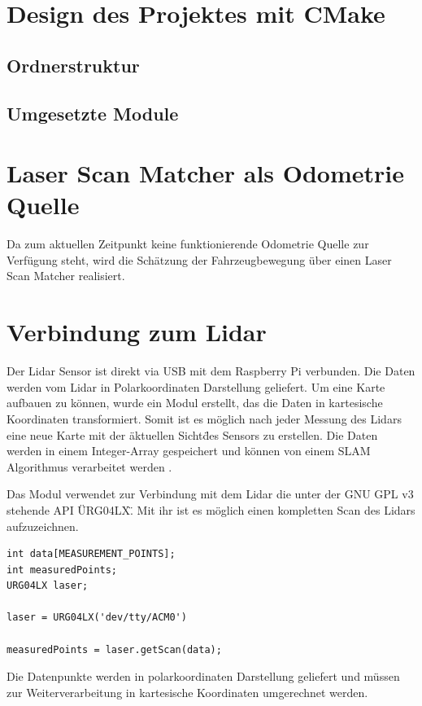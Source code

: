 \section{Design des Projektes mit CMake}


\subsection{Ordnerstruktur}

\subsection{Umgesetzte Module}

\section{Laser Scan Matcher als Odometrie Quelle}

Da zum aktuellen Zeitpunkt keine funktionierende Odometrie Quelle zur Verfügung steht, wird die Schätzung der Fahrzeugbewegung über einen Laser Scan Matcher realisiert. 

\section{Verbindung zum Lidar}

Der Lidar Sensor ist direkt via USB mit dem Raspberry Pi verbunden. Die Daten werden vom Lidar in Polarkoordinaten Darstellung geliefert. Um eine Karte aufbauen zu können, wurde ein Modul erstellt, das die Daten in kartesische Koordinaten transformiert. Somit ist es möglich nach jeder Messung des Lidars eine neue Karte mit der \"aktuellen Sicht\" des Sensors zu erstellen. Die Daten werden in einem Integer-Array gespeichert und können von einem SLAM Algorithmus verarbeitet werden . 

Das Modul verwendet zur Verbindung mit dem Lidar die unter der GNU GPL v3 stehende API \"URG04LX\". Mit ihr ist es möglich einen kompletten Scan des Lidars aufzuzeichnen. 

\begin{lstlisting}
int data[MEASUREMENT_POINTS]; 
int measuredPoints;
URG04LX laser;

laser = URG04LX('dev/tty/ACM0')

measuredPoints = laser.getScan(data);

\end{lstlisting}

Die Datenpunkte werden in polarkoordinaten Darstellung geliefert und müssen zur Weiterverarbeitung in kartesische Koordinaten umgerechnet werden. 

